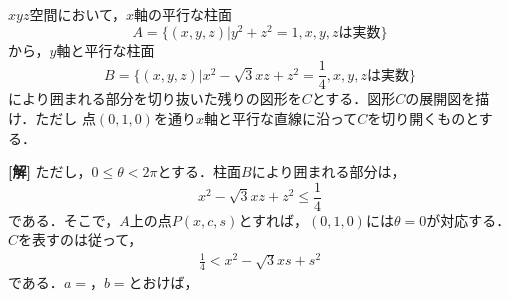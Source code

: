 \documentclass[a4j]{jarticle}
\begin{document}

     \begin{oframed}
     $xyz$空間において，$x$軸の平行な柱面
          \[A=\{(x,y,z)|y^2+z^2=1,x,y,z\text{は実数}\}\]
     から，$y$軸と平行な柱面
          \[B=\{(x,y,z)|x^2-\sqrt{3}xz+z^2=\frac{1}{4},x,y,z\text{は実数}\}\]
     により囲まれる部分を切り抜いた残りの図形を$C$とする．図形$C$の展開図を描け．ただし
     点$(0,1,0)$を通り$x$軸と平行な直線に沿って$C$を切り開くものとする．
     \end{oframed}

\setlength{\columnseprule}{0.4pt}
\begin{multicols}{2}
{\bf[解]}  \1 ただし，$0\le\theta<2\pi$とする．柱面$B$により囲まれる部分は，
     \[x^2-\sqrt{3}xz+z^2\le\frac{1}{4}\]
である．そこで，$A$上の点$P(x,c,s)$とすれば，$(0,1,0)$には$\theta=0$が対応する．
$C$を表すのは従って，
     \begin{align}
     \frac{1}{4}<x^2-\sqrt{3}xs+s^2     
     \end{align}
である．$a=$，$b=$とおけば，
     
     
\newpage
\end{multicols}
\end{document}
